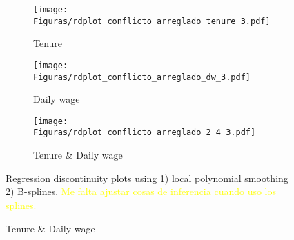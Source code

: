 \documentclass[oneside,11pt]{article}
\begin{document}


\begin{figure}[H]
     \caption{RD plots (Calculator + letter treatment)}
    \label{rd_t3}
\begin{center}
\begin{subfigure}{0.31\textwidth}

\caption{Tenure}
        \texttt{[image: Figuras/rdplot\_conflicto\_arreglado\_tenure\_3.pdf]}
    \end{subfigure}
    \begin{subfigure}{0.31\textwidth}
\caption{Daily wage}
        \texttt{[image: Figuras/rdplot\_conflicto\_arreglado\_dw\_3.pdf]}
    \end{subfigure}        
    \begin{subfigure}{0.31\textwidth}
\caption{Tenure \& Daily wage}
        \texttt{[image: Figuras/rdplot\_conflicto\_arreglado\_2\_4\_3.pdf]}
    \end{subfigure}
  \end{center}
  
    \scriptsize Regression discontinuity plots using 1) local polynomial smoothing 2) B-splines. \textcolor{yellow}{Me falta ajustar cosas de inferencia cuando uso los splines.}
\end{figure}










\newpage

\end{document}
